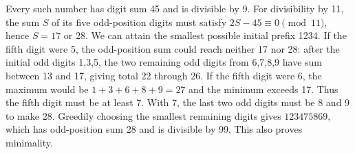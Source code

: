 Every such number has digit sum 45 and is divisible by 9. For divisibility by 11, the sum $S$ of its five odd-position digits must satisfy $2S-45\equiv0\pmod{11}$, hence $S=17$ or 28. We can attain the smallest possible initial prefix 1234. If the fifth digit were 5, the odd-position sum could reach neither 17 nor 28: after the initial odd digits 1,3,5, the two remaining odd digits from 6,7,8,9 have sum between 13 and 17, giving total 22 through 26. If the fifth digit were 6, the maximum would be $1+3+6+8+9=27$ and the minimum exceeds 17. Thus the fifth digit must be at least 7. With 7, the last two odd digits must be 8 and 9 to make 28. Greedily choosing the smallest remaining digits gives $\boxed{123475869}$, which has odd-position sum 28 and is divisible by 99. This also proves minimality.
